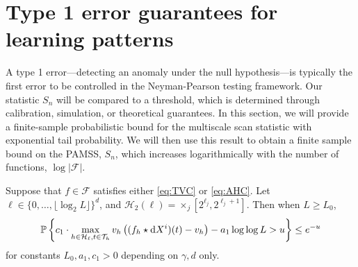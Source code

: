 \section{Type 1 error guarantees for learning patterns}
\label{sec:main}

A type 1 error---detecting an anomaly under the null hypothesis---is typically the first error to be controlled in the Neyman-Pearson testing framework.
Our statistic $S_n$ will be compared to a threshold, which is determined through calibration, simulation, or theoretical guarantees.
In this section, we will provide a finite-sample probabilistic bound for the multiscale scan statistic with exponential tail probability.
We will then use this result to obtain a finite sample bound on the PAMSS, $S_n$, which increases logarithmically with the number of functions, $\log |\mathcal F|$.

\begin{lemma}
\label{lem:single_scale}
Suppose that $f \in \mathcal F$ satisfies either \eqref{eq:TVC} or \eqref{eq:AHC}. 
Let $\ell \in \{0,\ldots, \lfloor \log_2 L\rfloor\}^d$, and $\mathcal H_2(\ell) = \times_j [2^{\ell_j}, 2^{\ell_j + 1}]$.  Then when $L \ge L_0$,
\begin{equation}
\mathbb P \left\{ c_1 \cdot \max_{h \in \mathcal H_\ell, t \in \mathcal T_h} v_h\left( (f_h \star {\rm d} X^i)(t) - v_h\right) - a_1 \log \log L > u \right\} \le e^{-u}
\end{equation}
for constants $L_0,a_1,c_1 > 0$ depending on $\gamma, d$ only.
\end{lemma}

